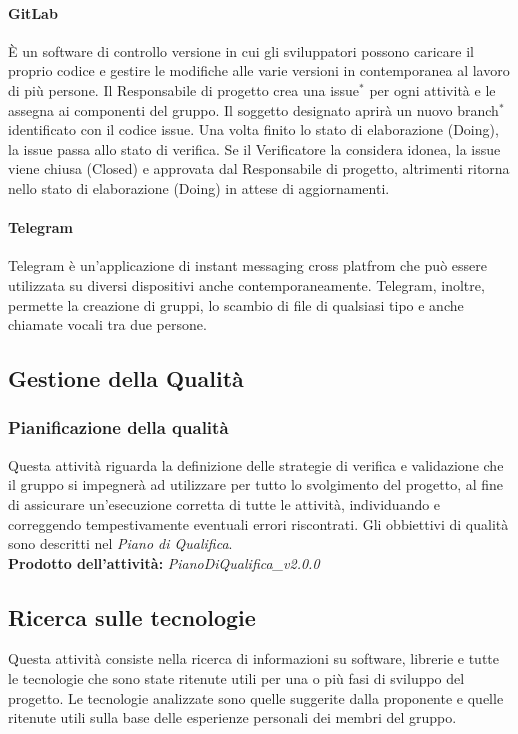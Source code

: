 \documentclass[11pt,a4paper]{article}
\begin{document}
{	\paragraph{GitLab\\}
	È un software di controllo versione in cui gli sviluppatori possono caricare il proprio codice e gestire le modifiche alle varie versioni in contemporanea al lavoro di più persone.
	Il Responsabile di progetto crea una issue$^*$ per ogni attività e le assegna ai componenti del gruppo. Il soggetto designato aprirà un nuovo branch$^*$ identificato con il codice issue.
	Una volta finito lo stato di elaborazione (Doing), la issue passa allo stato di verifica. Se il Verificatore la considera idonea, la issue viene chiusa (Closed) e approvata dal Responsabile di progetto, altrimenti ritorna nello stato di elaborazione (Doing) in attese di aggiornamenti.
	
	\paragraph{Telegram\\}

	Telegram è un'applicazione di instant messaging cross platfrom che può essere utilizzata su diversi dispositivi
	anche contemporaneamente. Telegram, inoltre, permette la creazione di gruppi, lo scambio di file di qualsiasi tipo
	e anche chiamate vocali tra due persone.
	
	\subsection{Gestione della Qualità}
	\subsubsection{Pianificazione della qualità}
	Questa attività riguarda la definizione delle strategie di verifica e validazione che il gruppo si impegnerà ad utilizzare per tutto lo svolgimento del progetto, al fine di assicurare un'esecuzione corretta di tutte le attività, individuando e correggendo tempestivamente eventuali errori riscontrati. Gli obbiettivi di qualità sono descritti nel \textit{Piano di Qualifica}.\\
	\textbf{Prodotto dell'attività:} \textit{PianoDiQualifica\_v2.0.0}
	
	\subsection{Ricerca sulle tecnologie} 
	Questa attività consiste nella ricerca di informazioni su software, librerie e tutte le tecnologie che sono state ritenute utili per una o più fasi di sviluppo del progetto. Le tecnologie analizzate  sono quelle suggerite dalla proponente e quelle ritenute utili sulla base delle esperienze personali dei membri del gruppo.
	
}
\end{document}
